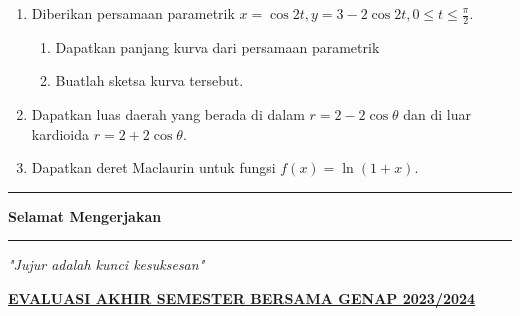 \documentclass[10pt,openany,a4paper]{article}
\theoremstyle{definition}
\theoremstyle{definition}
\theoremstyle{plain}
\begin{document}
\begin{enumerate}
\begin{center}
\end{center}
    \item Diberikan persamaan parametrik $x=\cos 2t, y=3-2\cos 2t, 0\leq t\leq \frac{\pi}{2}$.
    \begin{enumerate}
        \item Dapatkan panjang kurva dari persamaan parametrik
        \item Buatlah sketsa kurva tersebut.
    \end{enumerate}
    \item Dapatkan luas daerah yang berada di dalam $r=2-2\cos\theta$ dan di luar kardioida $r=2+2\cos\theta$.
    \item Dapatkan deret Maclaurin untuk fungsi $f(x)=\ln(1+x)$.
\end{enumerate}
\vfill
\begin{center}
    \noindent\rule{0.366416\linewidth}{2pt} \textbf{ Selamat Mengerjakan } \rule{0.366416\linewidth}{2pt}
\end{center}
\begin{center}
    \textit{"Jujur adalah kunci kesuksesan"}
\end{center}

\newpage
\begin{center}
	{\underline{\textbf{\MakeUppercase{EVALUASI AKHIR SEMESTER BERSAMA GENAP 2023/2024}}}}
    \end{center}
\end{document}
